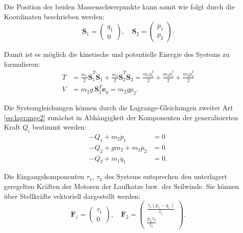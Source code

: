 Die Position der beiden Massenschwerpunkte kann somit wie folgt durch die Koordinaten beschrieben werden:
\begin{equation}
	\mathbf{S}_1 =
	\begin{pmatrix}
		q_1 \\
		0
	\end{pmatrix}, 
	\quad
	\mathbf{S}_2 =
	\begin{pmatrix}
		p_1 \\
		p_2
	\end{pmatrix}.
\end{equation}

Damit ist es möglich die kinetische und potentielle Energie des Systems zu formulieren:
\begin{align}
	T &= \frac{m_1}{2} \dot{\mathbf{S}}_1^T \dot{\mathbf{S}}_1 + \frac{m_2}{2} \dot{\mathbf{S}}_2^T \dot{\mathbf{S}}_2 = \frac{m_{1} \dot{q}_{1}^{2}}{2} + \frac{m_{2} \dot{p}_{1}^{2}}{2} + \frac{m_{2} \dot{p}_{2}^{2}}{2} \\
	V &= m_2 g \ \mathbf{S}_2^T \mathbf{e}_y = m_{2} g p_{2}.
\end{align}

Die Systemgleichungen können durch die Lagrange-Gleichungen zweiter Art \eqref{eq:lagrange2} zunächst in Abhängigkeit der Komponenten der generalisierten Kraft $Q_i$ bestimmt werden:
\begin{subequations}
	\label{eq:single_crane_sys_w_Q}
	\begin{align}
		- Q_{1} + m_{2} \ddot{p}_{1} &= 0\\
		- Q_{2} + g m_{2} + m_{2} \ddot{p}_{2} &= 0\\
		- Q_{3} + m_{1} \ddot{q}_{1} &= 0.
	\end{align}
\end{subequations}


Die Eingangskomponenten $\tau_1$, $\tau_2$ des Systems entsprechen den unterlagert geregelten Kräften der Motoren der Laufkatze bzw. der Seilwinde. Sie können über Stellkräfte vektoriell dargestellt werden:
\begin{equation}
	\mathbf{F}_1 =
	\left(\begin{matrix}
		\tau_{1} \\
		0
	\end{matrix}\right), \quad
	\mathbf{F}_2 =
	\left(\begin{matrix}
		\frac{\tau_{2} \left(p_{1} - q_{1}\right)}{l_{1}}\\
		\frac{p_{2} \tau_{2}}{l_{1}}
	\end{matrix}\right).
\end{equation}

